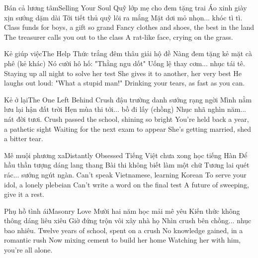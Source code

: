 \begin{tutuyetbox}{Bán cả lương tâm}{Selling Your Soul}
Quỹ lớp mẹ cho đem tặng trai
Áo xinh giày xịn sướng dặm dài
Tới tiết thủ quỹ lôi ra mắng
Mặt dơi mỏ nhọn... khóc tì tì.
\tcblower
Class funds for boys, a gift so grand
Fancy clothes and shoes, the best in the land
The treasurer calls you out to the class
A rat-like face, crying on the grass.
\end{tutuyetbox}

\begin{tutuyetbox}{Kẻ giúp việc}{The Help}
Thức trắng đêm thâu giải hộ đề
Nàng đem tặng kẻ mặt cà phê (kẻ khác)
Nó cười hô hố: "Thằng ngu dốt"
Uống lệ thay cơm... nhục tái tê.
\tcblower
Staying up all night to solve her test
She gives it to another, her very best
He laughs out loud: "What a stupid man!"
Drinking your tears, as fast as you can.
\end{tutuyetbox}

\begin{tutuyetbox}{Kẻ ở lại}{The One Left Behind}
Crush đậu trường danh sướng rạng ngời
Mình nằm lưu lại hận đất trời
Hẹn mùa thi tới... bồ đi lấy (chồng)
Nhục nhã nghìn năm... nát đời tươi.
\tcblower
Crush passed the school, shining so bright
You're held back a year, a pathetic sight
Waiting for the next exam to appear
She's getting married, shed a bitter tear.
\end{tutuyetbox}

\begin{tutuyetbox}{Mê muội phương xa}{Distantly Obsessed}
Tiếng Việt chưa xong học tiếng Hàn
Để hầu thần tượng dáng lang thang
Bài thi không biết làm một chữ
Tương lai quét rác... sướng ngút ngàn.
\tcblower
Can't speak Vietnamese, learning Korean
To serve your idol, a lonely plebeian
Can't write a word on the final test
A future of sweeping, give it a rest.
\end{tutuyetbox}

\begin{tutuyetbox}{Phụ hồ tình ái}{Masonry Love}
Mười hai năm học mải mê yêu
Kiến thức không thông dáng liêu xiêu
Giờ đứng trộn vôi xây nhà họ
Nhìn crush bên chồng... nhục bao nhiêu.
\tcblower
Twelve years of school, spent on a crush
No knowledge gained, in a romantic rush
Now mixing cement to build her home
Watching her with him, you're all alone.
\end{tutuyetbox}

